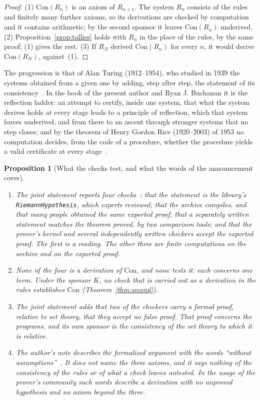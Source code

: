 \documentclass[11pt]{article}
\newtheorem{proposition}[theorem]{Proposition}
\theoremstyle{definition}
\theoremstyle{remark}
\DeclareRobustCommand{\lean}[1]{{\renewcommand{\_}{\textunderscore\allowbreak}\texttt{#1}}}
\begin{document}
\begin{proof}
(1) $\mathrm{Con}(R_n)$ is an axiom of $R_{n+1}$. The system $R_n$ consists of the rules and finitely many further axioms, so its derivations are checked by computation and it contains arithmetic; by the second sponsor it leaves $\mathrm{Con}(R_n)$ underived. (2) Proposition~\ref{prop:tallies} holds with $R_n$ in the place of the rules, by the same proof; (1) gives the rest. (3) If $R_N$ derived $\mathrm{Con}(R_n)$ for every $n$, it would derive $\mathrm{Con}(R_N)$, against~(1).
\end{proof}

\noindent The progression is that of Alan Turing (1912--1954), who studied in 1939 the systems obtained from a given one by adding, step after step, the statement of its consistency~\citep{turing39}. In the book of the present author and Ryan J. Buchanan it is the reflection ladder: an attempt to certify, inside one system, that what the system derives holds at every stage leads to a principle of reflection, which that system leaves underived, and from there to an ascent through stronger systems that no step closes; and by the theorem of Henry Gordon Rice (1920--2003) of 1953 no computation decides, from the code of a procedure, whether the procedure yields a valid certificate at every stage~\citep{metatheory,rice53}.

\begin{proposition}[What the checks test, and what the words of the announcement cover]\label{prop:checks}
\leavevmode
\begin{enumerate}[leftmargin=2em,itemsep=1pt]
\item The joint statement reports four checks~\citep{leanblog}: that the statement is the library's \lean{RiemannHypothesis}, which experts reviewed; that the archive compiles, and that many people obtained the same exported proof; that a separately written statement matches the theorem proved, by two comparison tools; and that the prover's kernel and several independently written checkers accept the exported proof. The first is a reading. The other three are finite computations on the archive and on the exported proof.
\item None of the four is a derivation of $\mathrm{Con}$, and none tests it: each concerns one term. Under the sponsor $K$, no check that is carried out as a derivation in the rules establishes $\mathrm{Con}$ (Theorem~\ref{thm:second}).
\item The joint statement adds that two of the checkers carry a formal proof, relative to set theory, that they accept no false proof. That proof concerns the programs, and its own sponsor is the consistency of the set theory to which it is relative.
\item The author's note describes the formalized argument with the words ``without assumptions''~\citep{alpoge}. It does not name the three axioms, and it says nothing of the consistency of the rules or of what a check leaves untested. In the usage of the prover's community such words describe a derivation with no unproved hypothesis and no axiom beyond the three.
\end{enumerate}
\end{proposition}
\end{document}
